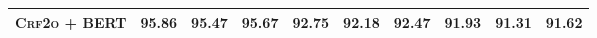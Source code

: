\begin{table*}[tb]
\begin{tabularx}{\textwidth}{lccccccccc}
    \textsc{Crf2o} + BERT                            & \textbf{95.86}           & 95.47                      & 95.67                    & \textbf{92.75}           & \textbf{92.18}           & \textbf{92.47}           & \textbf{91.93} & 91.31          & \textbf{91.62} \\
    \bottomrule
  \end{tabularx}
  \label{table:con-test}
\end{table*}

